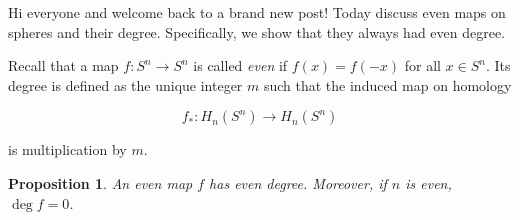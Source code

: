 \documentclass[a4paper, 12pt]{article}
\theoremstyle{definition}
\theoremstyle{plain}
\newtheorem{proposition}[definition]{Proposition}
\theoremstyle{remark}
\begin{document}
Hi everyone and welcome back to a brand new post! Today discuss even maps on spheres and their degree. Specifically, we show that they always had even degree.

Recall that a map \( f \colon S^n \to S^n \) is called \textit{even} if \( f(x) = f(-x) \) for all \( x \in S^n \). Its degree is defined as the unique integer \( m \) such that the induced map on homology

\begin{equation*}
    f_* \colon H_n(S^n) \to H_n(S^n)
\end{equation*}

is multiplication by \( m \).

\begin{proposition}
    An even map \( f \) has even degree. Moreover, if \( n \) is even, \( \deg f = 0 \).
\end{proposition}
\end{document}
